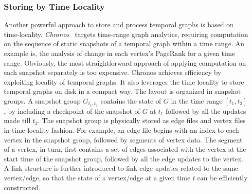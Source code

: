 \documentclass[graybox, natbib, nosecnum, twocolumn]{svmult}
\begin{document}
\subsubsection{Storing by Time Locality}
Another powerful approach to store and process temporal graphs is based on time-locality. {\em Chronos}~\citep{han2014chronos} targets time-range graph analytics, requiring computation on the sequence of static snapshots of a temporal graph within a time range. An example is, the analysis of change in each vertex's PageRank for a given time range. Obviously, the most straightforward approach of applying computation on each snapshot separately is too expensive. Chronos achieves efficiency by exploiting locality of temporal graphs.
It also leverages the time locality to store temporal graphs on disk in a compact way. The layout is organized in snapshot groups. A snapshot group $G_{t_1,t_2}$ contains the state of $G$ in the time range $[t_1,t_2]$, by including a checkpoint of the snapshot of $G$ at $t_1$ followed by all the updates made till $t_2$. The snapshot group is physically stored as edge files and vertex files in time-locality fashion. For example, an edge file begins with an index to each vertex in the snapshot group, followed by segments of vertex data. The segment of a vertex, in turn, first contains a set of edges associated with the vertex at the start time of the snapshot group, followed by all the edge updates to the vertex. A link structure is further introduced to link edge updates related to the same vertex/edge, so that the state of a vertex/edge at a given time $t$ can be efficiently constructed. %
\end{document}
